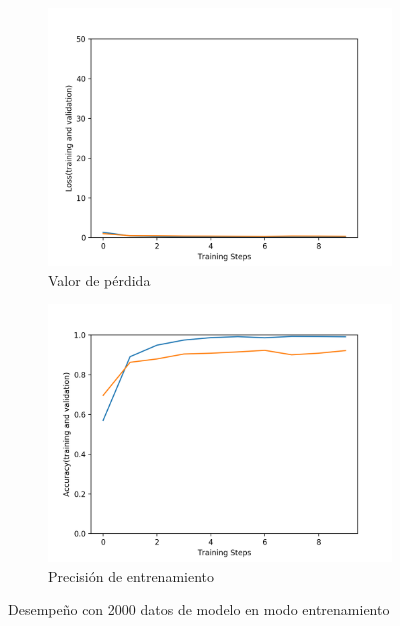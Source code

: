 \documentclass[transmag]{IEEEtran}
\begin{document}
\begin{figure}[H]
	\begin{subfigure}{0.5\textwidth}
		\centering
		\includegraphics[width=0.8\linewidth]{losstm2}
		\caption{Valor de pérdida}
	\end{subfigure}
	\begin{subfigure}{0.5\textwidth}
		\centering
		\includegraphics[width=0.8\linewidth]{acctm2}
		\caption{Precisión de entrenamiento}
	\end{subfigure}
	\caption{Desempeño con 2000 datos de modelo en modo entrenamiento}
	\label{fig:cnn2}
\end{figure}
\end{document}
